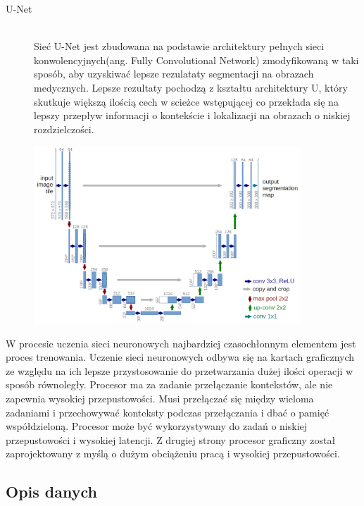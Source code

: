 \documentclass[a4paper,11pt,twoside]{report}
\theoremstyle{definition}
\begin{document}
\begin{description}

\item[U-Net] \hfill \\ 
Sieć U-Net jest zbudowana na podstawie architektury pełnych sieci konwolencyjnych(ang. Fully Convolutional Network) zmodyfikowaną w taki sposób, aby uzyskiwać lepsze rezulataty segmentacji na obrazach medycznych. Lepsze rezultaty pochodzą z kształtu architektury U, który skutkuje większą ilością cech w scieżce wstępującej co przekłada się na lepszy przepływ informacji o kontekście i lokalizacji na obrazach o niskiej rozdzielczości.

\begin{minipage}{\linewidth}
	\centering
	\includegraphics[width=10cm]{unet-architecture.png}
\end{minipage}

\end{description}

W procesie uczenia sieci neuronowych najbardziej czasochłonnym elementem jest proces trenowania. Uczenie sieci neuronowych odbywa się na kartach graficznych ze względu na ich lepsze przystosowanie do przetwarzania dużej ilości operacji w sposób równoległy. Procesor ma za zadanie przełączanie kontekstów, ale nie zapewnia wysokiej przepustowości. Musi przełączać się między wieloma zadaniami i przechowywać konteksty podczas przełączania i dbać o pamięć współdzieloną. Procesor może być wykorzystywany do zadań o niskiej przepustowości i wysokiej latencji. Z drugiej strony procesor graficzny został zaprojektowany z myślą o dużym obciążeniu pracą i wysokiej przepustowości.

\subsection{Opis danych}
\end{document}
